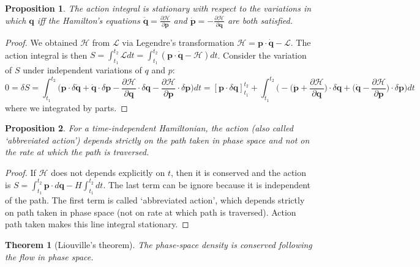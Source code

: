 \documentclass[a4paper]{article}
\theoremstyle{new}
\newtheorem{thm}{Theorem}[section]
\newtheorem{prop}{Proposition}[section]
\begin{document}
\begin{prop}
The action integral is stationary with respect to the variations in which $\mathbf{q}$ iff the Hamilton's equations $\mathbf{\dot{q}}=\frac{\partial\mathcal{H}}{\partial\mathbf{p}}$ and $\mathbf{\dot{p}}=-\frac{\partial\mathcal{H}}{\partial\mathbf{q}}$ are both satisfied.
\end{prop}
\begin{proof}
We obtained $\mathcal{H}$ from $\mathcal{L}$ via Legendre’s transformation $\mathcal{H}=\mathbf{p}\cdot\mathbf{\dot{q}}-\mathcal{L}$. The action integral is then $S=\int_{t_1}^{t_2}\mathcal{L}dt=\int_{t_1}^{t_2}(\mathbf{p}\cdot\mathbf{\dot{q}}-\mathcal{H})dt$. Consider the variation of $S$ under independent variations of $q$ and $p$:
$$0=\delta S=\int_{t_1}^{t_2}\bigg(\mathbf{p}\cdot\delta\mathbf{\dot{q}}+\mathbf{\dot{q}}\cdot\delta\mathbf{p}-\frac{\partial\mathcal{H}}{\partial\mathbf{q}}\cdot\delta\mathbf{q}-\frac{\partial\mathcal{H}}{\partial\mathbf{p}}\cdot\delta\mathbf{p}\bigg)dt=[\mathbf{p}\cdot\delta\mathbf{q}]_{t_1}^{t_2}+\int_{t_1}^{t_2}\bigg(-\bigg(\mathbf{\dot{p}}+\frac{\partial\mathcal{H}}{\partial\mathbf{q}}\bigg)\cdot\delta\mathbf{q}+\bigg(\mathbf{\dot{q}}-\frac{\partial\mathcal{H}}{\partial\mathbf{p}}\bigg)\cdot\delta\mathbf{p}\bigg)dt$$
where we integrated by parts.
\end{proof}
\begin{prop}
 For a time-independent Hamiltonian, the action (also called `abbreviated action') depends strictly on the path taken in phase space and not on the rate at which the path is traversed.
\end{prop}
\begin{proof}
 If $\mathcal{H}$ does not depends explicitly on $t$, then it is conserved and the action is $S=\int_{t_1}^{t_2}\mathbf{p}\cdot d\mathbf{q}-H\int_{t_1}^{t_2}dt$. The last term can be ignore because it is independent of the path. The first term is called `abbreviated action', which depends strictly on path taken in phase space (not on rate at which path is traversed). Action path taken makes this line integral stationary.
\end{proof}
\begin{thm}[Liouville's theorem]
The phase-space density is conserved following the flow in phase space. 
\end{thm}
\end{document}
